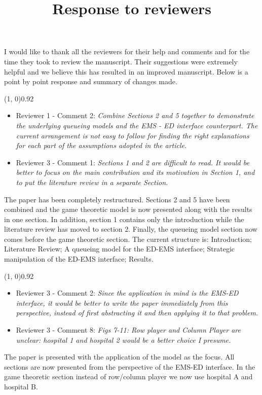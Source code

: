 \documentclass{article}
\title{Response to reviewers}
\author{}
\begin{document}
    \maketitle

    I would like to thank all the reviewers for their help and comments and for
    the time they took to review the manuscript.
    Their suggestions were extremely helpful and we believe this has resulted
    in an improved manuscript.
    Below is a point by point response and summary of changes made.


    \line(1, 0){0.92\textwidth}
    \begin{itemize}
        \item Reviewer 1 - Comment 2: \textit{Combine Sections 2 and 5
        together to demonstrate the underlying queueing models and the
        EMS - ED interface counterpart.
        The current arrangement is not easy to follow for finding the right
        explanations for each part of the assumptions adopted in the
        article.}

        \item Reviewer 3 - Comment 1: \textit{Sections 1 and 2 are
        difficult to read.
        It would be better to focus on the main contribution and its
        motivation in Section 1, and to put the literature review in a
        separate Section.}
    \end{itemize}
    The paper has been completely restructured.
    Sections 2 and 5 have been combined and the game theoretic model is now
    presented along with the results in one section.
    In addition, section 1 contains only the introduction while the
    literature review has moved to section 2.
    Finally, the queueing model section now comes before the game theoretic
    section.
    The current structure is: Introduction; Literature Review; A queueing
    model for the ED-EMS interface; Strategic manipulation of the ED-EMS
    interface; Results.

    \line(1, 0){0.92\textwidth}
    \begin{itemize}
        \item Reviewer 3 - Comment 2: \textit{Since the application in mind
        is the EMS-ED interface, it would be better to write the paper
        immediately from this perspective, instead of first abstracting it
        and then applying it to that problem.}
        \item Reviewer 3 - Comment 8: \textit{Figs 7-11: Row player and
        Column Player are unclear: hospital 1 and hospital 2 would be a
        better choice I presume.}
    \end{itemize}
    The paper is presented with the application of the model as the focus.
    All sections are now presented from the perspective of the EMS-ED
    interface.
    In the game theoretic section instead of row/column player we now use
    hospital A and hospital B.
\end{document}
